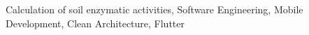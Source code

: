 \lipsum[1]

\begin{keywords}
Calculation of soil enzymatic activities, Software Engineering, Mobile Development, Clean Architecture, Flutter
\end{keywords}